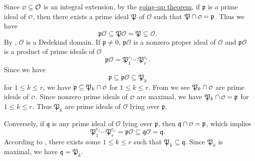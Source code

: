 \begin{prf}
    Since $\mathcalo \subseteq \mathcal{O}$ is an integral extension, by the \hyperref[th:going_up_and_going_down_theorems]{going-up theorem}, if $\mathfrak{p}$ is a prime ideal of $\mathcalo$, then there exists a prime ideal $\mathfrak{P}$ of $\mathcal{O}$ such that $\mathfrak{P}\cap \mathcalo=\mathfrak{p}$. Thus we have 
    \[
    \mathfrak{p}\mathcal{O}\subseteq \mathfrak{P} \mathcal{O}= \mathfrak{P} \subsetneq \mathcal{O}.
    \]
    By , $\mathcal{O}$ is a Dedekind domain. If $\mathfrak{p}\ne 0$, $\mathfrak{p}\mathcal{O}$ is a nonzero proper ideal of $\mathcal{O}$ and $\mathfrak{p}\mathcal{O}$ is a product of prime ideals of $\mathcal{O}$
    \[
    \mathfrak{p}\mathcal{O}=\mathfrak{P}_1^{e_1}\cdots\mathfrak{P}_r^{e_r}.
    \] 
    Since we have
    \[
        \mathfrak{p}\subseteq \mathfrak{p}\mathcal{O} \subseteq \mathfrak{P}_k
    \]
    for $1\le k\le r$, we have $\mathfrak{p}\subseteq \mathfrak{P}_k\cap \mathcalo$ for $1\le k\le r$. From  we see $\mathfrak{P}_k\cap \mathcalo$ are prime ideals of $\mathcalo$. Since nonzero prime ideals of $\mathcalo$ are maximal, we have $\mathfrak{P}_k\cap \mathcalo=\mathfrak{p}$ for $1\le k\le r$. Thus $\mathfrak{P}_k$ are prime ideals of $\mathcal{O}$ lying over $\mathfrak{p}$.

    Conversely, if $\mathfrak{q}$ is any prime ideal of $\mathcal{O}$ lying over $\mathfrak{p}$, then $\mathfrak{q}\cap \mathcalo=\mathfrak{p}$, which implies 
    \[
        \mathfrak{P}_1^{e_1}\cdots\mathfrak{P}_r^{e_r}=\mathfrak{p}\mathcal{O}\subseteq \mathfrak{q} \mathcal{O}=\mathfrak{q}.
    \]
    According to , there exists some $1\le k\le r$ such that $\mathfrak{P}_k\subseteq \mathfrak{q}$. Since $\mathfrak{P}_k$ is maximal, we have $\mathfrak{q}=\mathfrak{P}_k$. 
\end{prf}

